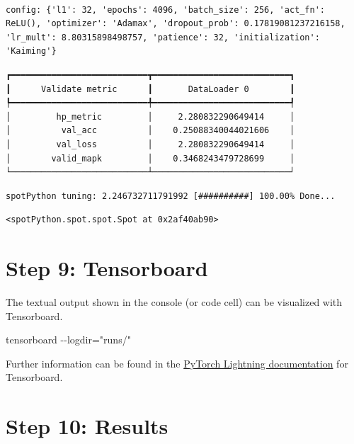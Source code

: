 \documentclass[
  letterpaper,
  DIV=11,
  numbers=noendperiod]{scrreprt}
\newenvironment{Shaded}{\begin{snugshade}}{\end{snugshade}}
\newcommand{\NormalTok}[1]{\textcolor[rgb]{0.00,0.23,0.31}{#1}}
\begin{document}
\begin{verbatim}

config: {'l1': 32, 'epochs': 4096, 'batch_size': 256, 'act_fn': ReLU(), 'optimizer': 'Adamax', 'dropout_prob': 0.17819081237216158, 'lr_mult': 8.80315898498757, 'patience': 32, 'initialization': 'Kaiming'}
\end{verbatim}

\begin{verbatim}
┏━━━━━━━━━━━━━━━━━━━━━━━━━━━┳━━━━━━━━━━━━━━━━━━━━━━━━━━━┓
┃      Validate metric      ┃       DataLoader 0        ┃
┡━━━━━━━━━━━━━━━━━━━━━━━━━━━╇━━━━━━━━━━━━━━━━━━━━━━━━━━━┩
│         hp_metric         │     2.280832290649414     │
│          val_acc          │    0.25088340044021606    │
│         val_loss          │     2.280832290649414     │
│        valid_mapk         │    0.3468243479728699     │
└───────────────────────────┴───────────────────────────┘
\end{verbatim}

\begin{verbatim}
spotPython tuning: 2.246732711791992 [##########] 100.00% Done...
\end{verbatim}

\begin{verbatim}
<spotPython.spot.spot.Spot at 0x2af40ab90>
\end{verbatim}

\hypertarget{sec-tensorboard-31}{%
\section{Step 9: Tensorboard}\label{sec-tensorboard-31}}

The textual output shown in the console (or code cell) can be visualized
with Tensorboard.

\begin{Shaded}
\begin{Highlighting}[]
\NormalTok{tensorboard {-}{-}logdir="runs/"}
\end{Highlighting}
\end{Shaded}

Further information can be found in the
\href{https://lightning.ai/docs/pytorch/stable/api/lightning.pytorch.loggers.tensorboard.html}{PyTorch
Lightning documentation} for Tensorboard.

\hypertarget{sec-results-31}{%
\section{Step 10: Results}\label{sec-results-31}}
\end{document}
